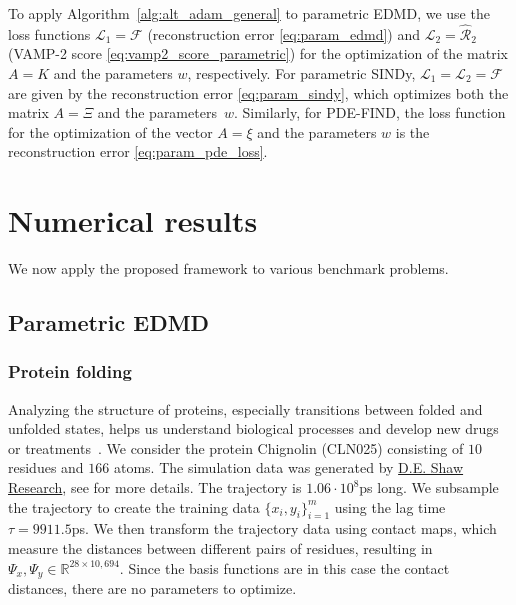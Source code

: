 \documentclass
[
    a4paper,
    DIV=11,
    abstract=true,
    11pt,
]
{scrartcl}
\newcommand{\R}{\mathbb{R}}                                      %
\newcommand{\ts}{\hspace*{0.1em}}                                %
\theoremstyle{definition}
\begin{document}
To apply Algorithm~\ref{alg:alt_adam_general} to parametric EDMD, we use the loss functions $\mathcal{L}_1 = \mathcal{F}$ (reconstruction error \eqref{eq:param_edmd}) and $\mathcal{L}_2 = \mathcal{\hat{R}}_2$ (VAMP-2 score \eqref{eq:vamp2_score_parametric}) for the optimization of the matrix $A = K$ and the parameters $w$, respectively. For parametric SINDy, $\mathcal{L}_1 = \mathcal{L}_2 = \mathcal{F}$ are given by the reconstruction error \eqref{eq:param_sindy}, which optimizes both the matrix $A = \Xi$ and the parameters~$w$. Similarly, for PDE-FIND, the loss function for the optimization of the vector $A = \xi$ and the parameters $w$ is the reconstruction error \eqref{eq:param_pde_loss}.

\section{Numerical results}
\label{sec:numerical}

We now apply the proposed framework to various benchmark problems.

\subsection{Parametric EDMD}

\subsubsection{Protein folding}

Analyzing the structure of proteins, especially transitions between folded and unfolded states, helps us understand biological processes and develop new drugs or treatments~\cite{dill2008protein}. We consider the protein Chignolin (CLN025) consisting of $10$ residues and $166$ atoms. The simulation data was generated by \href{https://www.deshawresearch.com/}{D.E. Shaw Research}, see \cite{lindorff2011fast} for more details. The trajectory is $1.06 \cdot 10^8$\ts ps long. We subsample the trajectory to create the training data $\{x_i, y_i\}_{i=1}^m$ using the lag time $\tau=9911.5$\ts ps. We then transform the trajectory data using contact maps, which measure the distances between different pairs of residues, resulting in $\Psi_x, \Psi_y \in \R^{28 \times 10,694}$. Since the basis functions are in this case the contact distances, there are no parameters to optimize.
\end{document}
